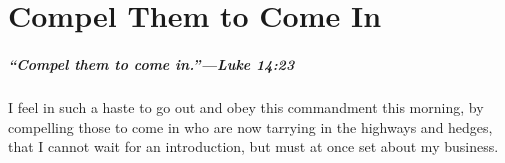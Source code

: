 \documentclass[
]{book}
\begin{document}
\clearpage
\setcounter{page}{1}

\hypertarget{compel-them-to-come-in}{%
\chapter{Compel Them to Come In}\label{compel-them-to-come-in}}

\hypertarget{compel-them-to-come-in.luke-1423}{%
\paragraph{``Compel them to come in.''---Luke 14:23}\label{compel-them-to-come-in.luke-1423}}

I feel in such a haste to go out and obey this commandment this morning, by compelling those to come in who are now tarrying in the highways and hedges, that I cannot wait for an introduction, but must at once set about my business.
\end{document}
